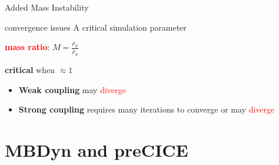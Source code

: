 \documentclass[10pt,t]{beamer}
\begin{document}
\begin{frame}{Added Mass Instability}
\label{addedmass}
\begin{alertblock}{convergence issues}
A critical simulation parameter

\begin{center}
    \textcolor{red}{\textbf{mass ratio}}: $M = \frac{\rho_F}{\rho_S}$ 
\end{center}

    


\vspace{0.1cm}
\textbf{critical} when $\approx 1$
\vspace{0.1cm}


\end{alertblock}

\vspace{0.8cm}

    \begin{itemize}
        \item \textbf{Weak coupling} may \textcolor{red}{diverge}
        \item \textbf{Strong coupling} requires \textcolor{dorange}{many iterations} to converge or may \textcolor{red}{diverge}
    \end{itemize}

\vspace{0.8cm}


\hyperlink{dimensionless}{}

\end{frame}





\section{MBDyn and preCICE}
\end{document}
